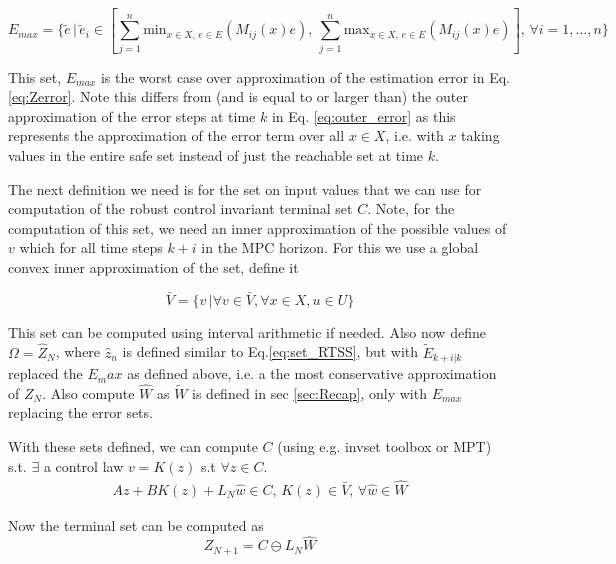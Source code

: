 \documentclass{article}[14pt]
\begin{document}
\begin{equation}
E_{max} = \{\tilde{e}\,|\,\tilde{e}_i\in[\sum_{j=1}^n \text{min}_{x\in X,\,e\in E}(M_{ij}(x)e),\, \sum_{j=1}^n \text{max}_{x\in X,\,e\in E}(M_{ij}(x)e)],\,\forall i=1,\dotsc,n\}
\end{equation}

This set, $E_{max}$ is the worst case over approximation of the estimation error in Eq.\ref{eq:Zerror}. Note this differs from (and is equal to or larger than) the outer approximation of the error steps at time $k$ in Eq. \ref{eq:outer_error} as this represents the approximation of the error term over all $x\in X$, i.e. with $x$ taking values in the entire safe set instead of just the reachable set at time $k$.

The next definition we need is for the set on input values that we can use for computation of the robust control invariant terminal set $C$. Note, for the computation of this set, we need an inner approximation of the possible values of $v$ which for all time steps $k+i$ in the MPC horizon. For this we use a global convex inner approximation of the set, define it

\begin{equation}
\bar{V} = \{v\,|\forall v\in \bar{V},\forall x\in X, u\in U\}
\end{equation}

This set can be computed using interval arithmetic if needed. Also now define $\Omega=\hat{Z}_N$, where $\hat{z}_n$ is defined similar to Eq.\ref{eq:set_RTSS}, but with $\tilde{E}_{k+i|k}$ replaced the $E_max$ as defined above, i.e. a the most conservative approximation of $Z_N$. Also compute $\hat{W}$ as $\tilde{W}$ is defined in sec \ref{sec:Recap}, only with $E_{max}$ replacing the error sets.

With these sets defined, we can compute $C$ (using e.g. invset toolbox or MPT) s.t. $\exists$ a control law $v=K(z)$ s.t $\forall z \in C$.
\begin{subequations}
\begin{align}
Az+BK(z)+L_N\hat{w}\in C,\, K(z)\in \bar{V}, \,\forall \hat{w} \in \hat{W}
\end{align}
\end{subequations}

Now the terminal set can be computed as 
\begin{equation}
Z_{N+1}=C\ominus L_N\hat{W}
\end{equation}
\end{document}
